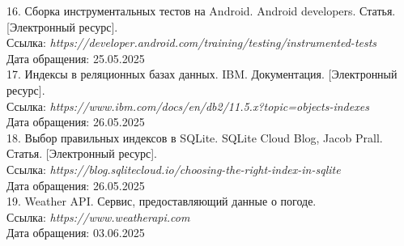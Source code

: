 \hspace{-1.25cm}
16. Сборка инструментальных тестов на Android. Android developers. Статья. [Электронный ресурс]. \\
Ссылка: \textit { https://developer.android.com/training/testing/instrumented-tests } \\
Дата обращения: 25.05.2025 \\

\hspace{-1.25cm}
17. Индексы в реляционных базах данных. IBM. Документация. [Электронный ресурс]. \\
Ссылка: \textit { https://www.ibm.com/docs/en/db2/11.5.x?topic=objects-indexes } \\
Дата обращения: 26.05.2025 \\

\hspace{-1.25cm}
18. Выбор правильных индексов в SQLite. SQLite Cloud Blog, Jacob Prall. Статья. [Электронный ресурс]. \\
Ссылка: \textit { https://blog.sqlitecloud.io/choosing-the-right-index-in-sqlite } \\
Дата обращения: 26.05.2025 \\

\hspace{-1.25cm}
19. Weather API. Сервис, предоставляющий данные о погоде. \\
Ссылка: \textit { https://www.weatherapi.com } \\
Дата обращения: 03.06.2025 \\
